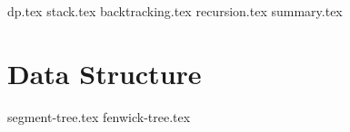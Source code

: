 \documentclass{../latex-setting/cmemoir}
\begin{document}

\frontmatter

\tableofcontents

\restoregeometry%

\mainmatter{}


{dp.tex}
{stack.tex}
{backtracking.tex}
{recursion.tex}
{summary.tex}


\part{Data Structure}
{segment-tree.tex}
{fenwick-tree.tex}
\end{document}
